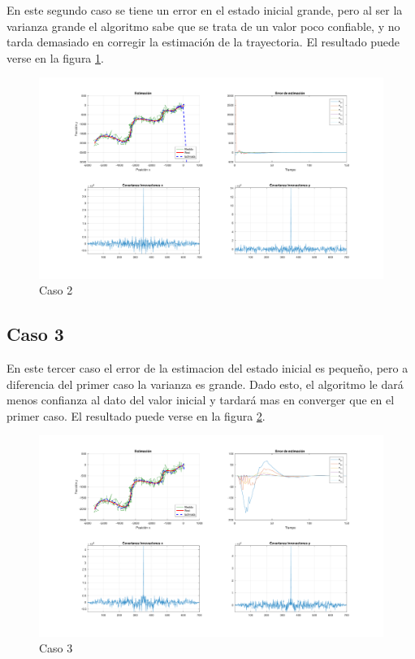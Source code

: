 	En este segundo caso se tiene un error en el estado inicial grande, pero al ser la varianza grande el algoritmo sabe que se trata de un valor poco confiable, y no tarda demasiado en corregir la estimación de la trayectoria. El resultado puede verse en la figura \ref{fig:ej3b}.
		
		\begin{figure}[H]
			\centering
			\includegraphics[scale=0.5,trim={6,5cm 0 0 0}]{Figuras/graf_ej3b.pdf}
			\caption{Caso 2}
			\label{fig:ej3b}
		\end{figure}
	
	\subsection{Caso 3}
	
	En este tercer caso el error de la estimacion del estado inicial es pequeño, pero a diferencia del primer caso la varianza es grande. Dado esto, el algoritmo le dará menos confianza al dato del valor inicial y tardará mas en converger que en el primer caso. El resultado puede verse en la figura \ref{fig:ej3c}.
	
		\begin{figure}[H]
			\centering
			\includegraphics[scale=0.5,trim={6,5cm 0 0 0}]{Figuras/graf_ej3c.pdf}
			\caption{Caso 3}
			\label{fig:ej3c}
		\end{figure}
	
